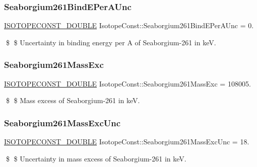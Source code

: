 \subsubsection{\texorpdfstring{Seaborgium261\+Bind\+E\+Per\+A\+Unc}{Seaborgium261BindEPerAUnc}}
{\footnotesize\ttfamily \mbox{\hyperlink{group___isotope_const-_macros_ga8f45a7272ce02c0b4c65c44636ed719a}{I\+S\+O\+T\+O\+P\+E\+C\+O\+N\+S\+T\+\_\+\+D\+O\+U\+B\+LE}} Isotope\+Const\+::\+Seaborgium261\+Bind\+E\+Per\+A\+Unc = 0.}

\$ \$ Uncertainty in binding energy per A of Seaborgium-\/261 in keV. \mbox{\label{group___isotope_const-_seaborgium-_sg261_ga548e7c1671b1941726911e57221b737e}} 
\subsubsection{\texorpdfstring{Seaborgium261\+Mass\+Exc}{Seaborgium261MassExc}}
{\footnotesize\ttfamily \mbox{\hyperlink{group___isotope_const-_macros_ga8f45a7272ce02c0b4c65c44636ed719a}{I\+S\+O\+T\+O\+P\+E\+C\+O\+N\+S\+T\+\_\+\+D\+O\+U\+B\+LE}} Isotope\+Const\+::\+Seaborgium261\+Mass\+Exc = 108005.}

\$ \$ Mass excess of Seaborgium-\/261 in keV. \mbox{\label{group___isotope_const-_seaborgium-_sg261_ga32ab144afc38e898e79dc094395c2aed}} 
\subsubsection{\texorpdfstring{Seaborgium261\+Mass\+Exc\+Unc}{Seaborgium261MassExcUnc}}
{\footnotesize\ttfamily \mbox{\hyperlink{group___isotope_const-_macros_ga8f45a7272ce02c0b4c65c44636ed719a}{I\+S\+O\+T\+O\+P\+E\+C\+O\+N\+S\+T\+\_\+\+D\+O\+U\+B\+LE}} Isotope\+Const\+::\+Seaborgium261\+Mass\+Exc\+Unc = 18.}

\$ \$ Uncertainty in mass excess of Seaborgium-\/261 in keV. \mbox{\label{group___isotope_const-_seaborgium-_sg261_ga98377a9a34526e4dcefa0e3fecf6f559}} 
